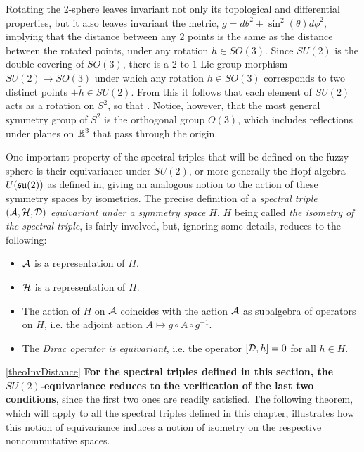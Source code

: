 Rotating the 2-sphere leaves invariant not only its topological and differential properties, but it also leaves invariant the metric, $g = d\theta^2 + \sin^2(\theta) d\phi^2$, implying that the distance between any $2$ points is the same as the distance between the rotated points, under any rotation $h \in SO(3)$. Since $SU(2)$ is the double covering of $SO(3)$, there is a $2$-to-$1$ Lie group morphism $SU(2) \to SO(3)$ under which any rotation $h \in SO(3)$ corresponds to two distinct points $\pm \tilde h \in SU(2)$. From this it follows that each element of $SU(2)$ acts as a rotation on $S^2$, so that . Notice, however, that the most general symmetry group of $S^2$ is the orthogonal group $O(3)$, which includes reflections under planes on $\mathbb{R}^3$ that pass through the origin.

One important property of the spectral triples that will be defined on the fuzzy sphere is their equivariance under $SU(2)$, or more generally the Hopf algebra $U(\mathfrak{su}(2))$ as defined in\cite{Sitarz}, giving an analogous notion to the action of these symmetry spaces by isometries. The precise definition of a \textit{spectral triple $(\mathcal A, \mathcal H, \mathcal D)$ equivariant under a symmetry space $H$}, $H$ being called \textit{the isometry of the spectral triple}, is fairly involved, but, ignoring some details, reduces to the following:
    \begin{itemize}
    
    \item $\mathcal A$ is a representation of $H$.
    
    \item $\mathcal H $ is a representation of $H$.
    
    \item The action of $H$ on $\mathcal A$ coincides with the action $\mathcal A$ as subalgebra of operators on $H$, i.e. the adjoint action $A \mapsto g \circ A \circ g^{-1}$. %
    
    \item The \textit{Dirac operator is equivariant}, i.e. the operator $[\mathcal D, h] = 0$ for all $h \in H$.
    
    \end{itemize}
\ref{theoInvDistance}
\textbf{For the spectral triples defined in this section, the $SU(2)$-equivariance reduces to the verification of the last two conditions}, since the first two ones are readily satisfied. The following theorem, which will apply to all the spectral triples defined in this chapter, illustrates how this notion of equivariance induces a notion of isometry on the respective noncommutative spaces.

